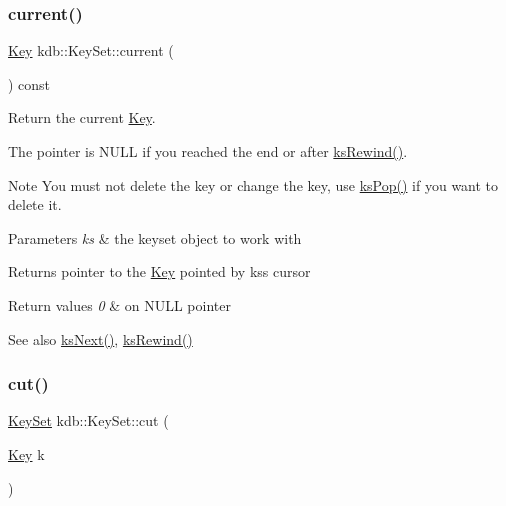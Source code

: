 \subsubsection{\texorpdfstring{current()}{current()}}
{\footnotesize\ttfamily \mbox{\hyperlink{classkdb_1_1Key}{Key}} kdb\+::\+Key\+Set\+::current (\begin{DoxyParamCaption}{ }\end{DoxyParamCaption}) const\hspace{0.3cm}{\ttfamily [inline]}}



Return the current \mbox{\hyperlink{classkdb_1_1Key}{Key}}. 

The pointer is N\+U\+LL if you reached the end or after \mbox{\hyperlink{group__keyset_gabe793ff51f1728e3429c84a8a9086b70}{ks\+Rewind()}}.

\begin{DoxyNote}{Note}
You must not delete the key or change the key, use \mbox{\hyperlink{group__keyset_gae42530b04defb772059de0600159cf69}{ks\+Pop()}} if you want to delete it.
\end{DoxyNote}

\begin{DoxyParams}{Parameters}
{\em ks} & the keyset object to work with \\
\hline
\end{DoxyParams}
\begin{DoxyReturn}{Returns}
pointer to the \mbox{\hyperlink{classkdb_1_1Key}{Key}} pointed by {\ttfamily ks\textquotesingle{}s} cursor 
\end{DoxyReturn}

\begin{DoxyRetVals}{Return values}
{\em 0} & on N\+U\+LL pointer \\
\hline
\end{DoxyRetVals}
\begin{DoxySeeAlso}{See also}
\mbox{\hyperlink{group__keyset_ga317321c9065b5a4b3e33fe1c399bcec9}{ks\+Next()}}, \mbox{\hyperlink{group__keyset_gabe793ff51f1728e3429c84a8a9086b70}{ks\+Rewind()}} 
\end{DoxySeeAlso}
\mbox{\label{classkdb_1_1KeySet_ab283da798a7670d5c3f0e1a5b821e666}} 
\subsubsection{\texorpdfstring{cut()}{cut()}}
{\footnotesize\ttfamily \mbox{\hyperlink{classkdb_1_1KeySet}{Key\+Set}} kdb\+::\+Key\+Set\+::cut (\begin{DoxyParamCaption}\item[{\mbox{\hyperlink{classkdb_1_1Key}{Key}}}]{k }\end{DoxyParamCaption})\hspace{0.3cm}{\ttfamily [inline]}}



